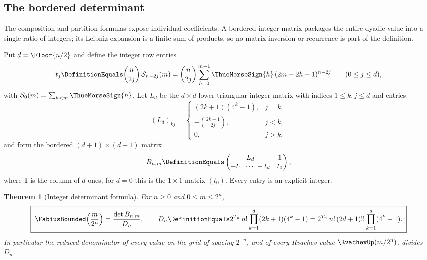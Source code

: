 \documentclass[11pt,oneside]{article}
\theoremstyle{plain}
\newtheorem{theorem}{Theorem}[section]
\theoremstyle{definition}
\theoremstyle{remark}
\newcommand{\Fb}{\FabiusBounded}            %
\newcommand{\up}{\RvachevUp}                %
\newcommand{\tm}[1]{\ThueMorseSign{#1}}     %
\newcommand{\Spow}[2]{\mathcal{S}_{#1}(#2)} %
\newcommand{\Tr}[1]{T_{#1}}                 %
\begin{document}
\subsection{The bordered determinant}
\label{rf:sec:determinant-formula}

The composition and partition formulas expose individual coefficients.  A
bordered integer matrix packages the entire dyadic value into a single
ratio of integers; its Leibniz expansion is a finite sum of products, so no
matrix inversion or recurrence is part of the definition.

Put $d=\Floor{n/2}$ and define the integer row entries
\begin{equation}
 t_{j}\DefinitionEquals\binom{n}{2j}\,\Spow{n-2j}{m}
 =\binom{n}{2j}\sum_{h=0}^{m-1}\tm{h}\,(2m-2h-1)^{n-2j}\qquad(0\le j\le d),
 \label{rf:eq:determinant-row}
\end{equation}
with $\Spow{0}{m}=\sum_{h<m}\tm{h}$.  Let $L_{d}$ be the $d\times d$ lower
triangular integer matrix with indices $1\le k,j\le d$ and entries
\begin{equation}
 (L_{d})_{kj}=
 \begin{cases}
 (2k+1)(4^{k}-1),& j=k,\\
 -\binom{2k+1}{2j},& j<k,\\
 0,& j>k,
 \end{cases}
 \label{rf:eq:determinant-L}
\end{equation}
and form the bordered $(d+1)\times(d+1)$ matrix
\begin{equation}
 B_{n,m}\DefinitionEquals
 \begin{pmatrix}
 L_{d} & \mathbf 1\\
 -t_{1}\ \cdots\ -t_{d} & t_{0}
 \end{pmatrix},
 \label{rf:eq:determinant-B}
\end{equation}
where $\mathbf 1$ is the column of $d$ ones; for $d=0$ this is the
$1\times1$ matrix $(t_{0})$.  Every entry is an explicit integer.

\begin{theorem}[Integer determinant formula]
\label{rf:thm:determinant}
For $n\ge0$ and $0\le m\le2^{n}$,
\begin{equation}
 \boxed{\;
 \Fb\!\left(\frac{m}{2^{n}}\right)
 =\frac{\det B_{n,m}}{D_{n}},\qquad
 D_{n}\DefinitionEquals2^{\Tr{n}}\,n!\prod_{k=1}^{d}(2k+1)(4^{k}-1)
 =2^{\Tr{n}}\,n!\,(2d+1)!!\prod_{k=1}^{d}(4^{k}-1).\;}
 \label{rf:eq:determinant-value}
\end{equation}
In particular the reduced denominator of every value on the grid of spacing
$2^{-n}$, and of every Rvachev value $\up(m/2^{n})$, divides $D_{n}$.
\end{theorem}
\end{document}

